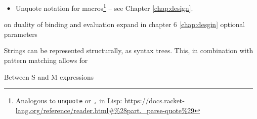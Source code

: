 \begin{itemize}
\begin{lstlisting}
        -- logs `Hello, Bill.`
        log ['[Hello, {name}.]]
    \end{lstlisting}
    
    As we can see this gives us a very convenient notation for string interpolation, similar to e.g. template literals in JavaScript\footnote{\url{https://developer.mozilla.org/en-US/docs/Web/JavaScript/Reference/Template_literals}}.
    In order to escape curly braces, they should be doubled:
    \begin{lstlisting}
        -- logs `Hello, {name}.`
        log ['[Hello, {{name}}.]]
    \end{lstlisting}
    
    I also added a special type of string -- an HTML string, where interpolation notation is the other way around -- double braces cause substitution, single braces do nothing:
    \begin{lstlisting}
        bind [name '|Bill]
        -- logs `<h1>Hello, Bill.</h1>`
        log [html'[<h1>Hello, {{name}}.</h1>]]
        
        -- logs `<h1>Hello, {name}.</h1>`
        log [html'[<h1>Hello, {name}.</h1>]]
    \end{lstlisting}
    
    This is to enable embedding CSS and JavaScript code inside those strings, without having to constantly escape brace characters.
    
    \item Unquote notation for macros\footnote{Analogous to \texttt{unquote} or \texttt{,} in Lisp: \url{https://docs.racket-lang.org/reference/reader.html\#\%28part._parse-quote\%29}} -- see Chapter \ref{chap:design}.
\end{itemize}

on duality of binding and evaluation
expand in chapter 6 \ref{chap:desgin}
    optional parameters


Strings can be represented structurally, as syntax trees. This, in combination with pattern matching allows for 

\cite{eloquentjs}
Between S and M expressions 

